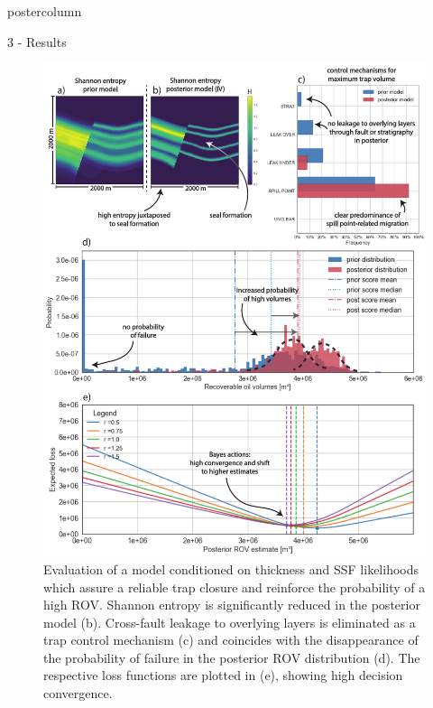 \documentclass{beamer}
\begin{document}
\begin{frame}
\begin{columns}
\begin{column}{.499\textwidth}
\begin{beamercolorbox}[center]{postercolumn}
\begin{minipage}{.98\textwidth}
{\begin{myblock}{3 - Results}				
	\vspace{0.1em}
	\begin{figure}
		\begin{minipage}{0.99\textwidth}
			\begin{minipage}[t]{0.49\textwidth}
				\centering\includegraphics[width=1\textwidth]{figures/ML4.pdf}
				\caption{Evaluation of a model conditioned on thickness and SSF likelihoods which assure a reliable trap closure and reinforce the probability of a high ROV. Shannon entropy is significantly reduced in the posterior model (b). Cross-fault leakage to overlying layers is eliminated as a trap control mechanism (c) and coincides with the disappearance of the probability of failure in the posterior ROV distribution (d). The respective loss functions are plotted in (e), showing high decision convergence.}

\end{minipage}
\end{minipage}
\end{figure}
\end{myblock}}
\end{minipage}
\end{beamercolorbox}
\end{column}
\end{columns}
\end{frame}
\end{document}
